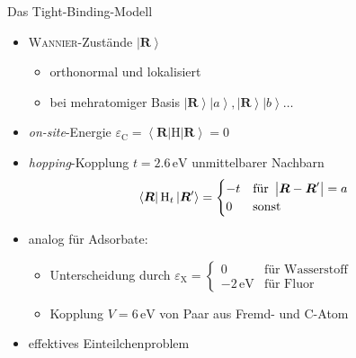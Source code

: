 \documentclass{beamer}
\newcommand \bra[1]{\left \langle #1 \right |}
\newcommand \ket[1]{\left | #1 \right \rangle}
\newcommand \abs[1]{\left | #1 \right |}
\def \epsilon {\varepsilon}
\def \vec {\boldsymbol}
\newcommand \op[1]{\mathrm{#1}}
\def \eX {\varepsilon_\mathrm{X}}
\begin{document}
	\begin{frame}{Das Tight-Binding-Modell}
		\begin{itemize}
			\item \textsc{Wannier}-Zustände $\ket{\vec R}$
			\begin{itemize}
				\item orthonormal und lokalisiert
				\item bei mehratomiger Basis $\ket{\vec R} \ket a, \ket{\vec R} \ket b \dots$
			\end{itemize}
			\item \emph{on-site}-Energie $\epsilon_\mathrm{C} = \bra{\vec R} \op H \ket{\vec R} = 0$
			\item \textit{hopping}-Kopplung $t = 2.6\,\mathrm{eV}$ unmittelbarer Nachbarn
			\begin{align*}
				\bra{\vec R} \op H_t \ket{\vec R\smash'} =
				\begin{cases}
					-t & \text{für } \abs{\vec R - \vec R'} = a \\ 0 & \text{sonst}
				\end{cases}
			\end{align*}
			\item analog für Adsorbate:
			\begin{itemize}
				\item Unterscheidung durch $\eX = \begin{cases} 0 & \text{für Wasserstoff} \\ -2\,\mathrm{eV} & \text{für Fluor} \end{cases}$
				\item Kopplung $V = 6\,\mathrm{eV}$ von Paar aus Fremd- und C-Atom
			\end{itemize}
			\item effektives Einteilchenproblem
		\end{itemize}
	\end{frame}
\end{document}
